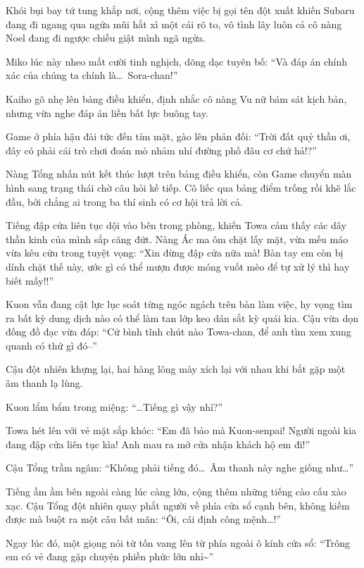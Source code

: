 \documentclass[../main.tex]{subfiles}
\begin{document}
Khói bụi bay tứ tung khắp nơi, cộng thêm việc bị gọi tên đột xuất khiến Subaru đang đi ngang qua ngứa mũi hắt xì một cái rõ to, vô tình lây luôn cả cô nàng Noel đang đi ngược chiều giật mình ngã ngửa.


Miko lúc này nheo mắt cười tinh nghịch, dõng dạc tuyên bố: ``Và đáp án chính xác của chúng ta chính là\dots\ Sora-chan!''

Kaiho gõ nhẹ lên bảng điều khiển, định nhắc cô nàng Vu nữ bám sát kịch bản, nhưng vừa nghe đáp án liền bất lực buông tay.

Game ở phía hậu đài tức đến tím mặt, gào lên phản đối: ``Trời đất quỷ thần ơi, đây có phải cái trò chơi đoán mò nhảm nhí đường phố đâu cơ chứ hả!?''

Nàng Tổng nhấn nút kết thúc lượt trên bảng điều khiển, còn Game chuyển màn hình sang trạng thái chờ câu hỏi kế tiếp. Cô liếc qua bảng điểm trống rồi khẽ lắc đầu, bởi chẳng ai trong ba thí sinh có cơ hội trả lời cả.

\ct

Tiếng đập cửa liên tục dội vào bên trong phòng, khiến Towa cảm thấy các dây thần kinh của mình sắp căng đứt. Nàng Ác ma ôm chặt lấy mặt, vừa mếu máo vừa kêu cứu trong tuyệt vọng: ``Xin đừng đập cửa nữa mà! Bàn tay em còn bị dính chặt thế này, ước gì có thể mượn được móng vuốt mèo để tự xử lý thì hay biết mấy!!''

Kuon vẫn đang cật lực lục soát từng ngóc ngách trên bàn làm việc, hy vọng tìm ra bất kỳ dung dịch nào có thể làm tan lớp keo dán sắt kỳ quái kia. Cậu vừa dọn đống đồ đạc vừa đáp: ``Cứ bình tĩnh chút nào Towa-chan, để anh tìm xem xung quanh có thứ gì đó--''

Cậu đột nhiên khựng lại, hai hàng lông mày xích lại với nhau khi bắt gặp một âm thanh lạ lùng.

Kuon lẩm bẩm trong miệng: ``\dots Tiếng gì vậy nhỉ?''

Towa hét lên với vẻ mặt sắp khóc: ``Em đã bảo mà Kuon-senpai! Người ngoài kia đang đập cửa liên tục kìa! Anh mau ra mở cửa nhận khách hộ em đi!''

Cậu Tổng trầm ngâm: ``Không phải tiếng đó\dots\ Âm thanh này nghe giống như\dots''

Tiếng ầm ầm bên ngoài càng lúc càng lớn, cộng thêm những tiếng cào cấu xào xạc. Cậu Tổng đột nhiên quay phắt người về phía cửa sổ cạnh bên, không kiềm được mà buột ra một câu bất mãn: ``Ôi, cái định công mệnh\dots!''

Ngay lúc đó, một giọng nói từ tốn vang lên từ phía ngoài ô kính cửa sổ: ``Trông em có vẻ đang gặp chuyện phiền phức lớn nhỉ\~{}''
\end{document}
